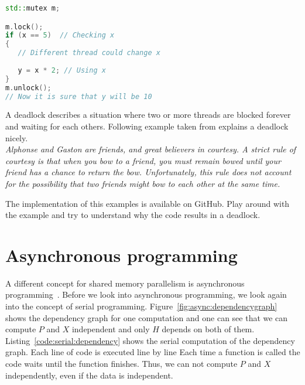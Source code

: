 \begin{lstlisting}[language=c++,caption={Example for the race condition.\label{code:racecondition}},float,floatplacement=tb]
std::mutex m;

m.lock();
if (x == 5)  // Checking x
{
   // Different thread could change x 
      
   y = x * 2; // Using x
}
m.unlock();
// Now it is sure that y will be 10
\end{lstlisting}


A deadlock describes a situation where two or more threads are blocked forever and waiting for each others. Following example taken from explains a deadlock nicely. \\

\textit{Alphonse and Gaston are friends, and great believers in courtesy. A strict rule of courtesy is that when you bow to a friend, you must remain bowed until your friend has a chance to return the bow. Unfortunately, this rule does not account for the possibility that two friends might bow to each other at the same time.}

\begin{exercise}
The implementation of this examples is available on GitHub. Play around with the example and try to understand why the code results in a deadlock. 
\end{exercise}

\chapter{Asynchronous programming}
\label{sec:async:coding}
A different concept for shared memory parallelism is asynchronous programming~\cite{williams2012c++}. Before we look into asynchronous programming, we look again into the concept of serial programming. Figure~\ref{fig:async:dependencygraph} shows the dependency graph for one computation and one can see that we can compute $P$ and $X$ independent and only $H$ depends on both of them. Listing~\ref{code:serial:dependency} shows the serial computation of the dependency graph. Each line of code is executed line by line Each time a function is called the code waits until the function finishes. Thus, we can not compute $P$ and $X$ independently, even if the data is independent. 

